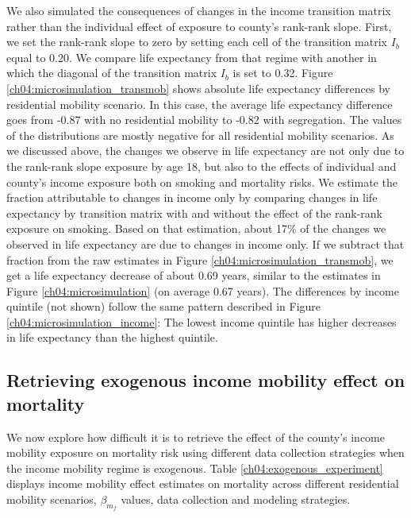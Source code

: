 \documentclass[class=article, crop=false, 12pt]{standalone}
\begin{document}
We also simulated the consequences of changes in the income transition matrix rather than the individual effect of exposure to county's rank-rank slope. First, we set the rank-rank slope to zero by setting each cell of the transition matrix $I_b$ equal to 0.20. We compare life expectancy from that regime with another in which the diagonal of the transition matrix $I_b$ is set to 0.32. Figure \ref{ch04:microsimulation_transmob} shows absolute life expectancy differences by residential mobility scenario. In this case, the average life expectancy difference goes from -0.87 with no residential mobility to -0.82 with segregation. The values of the distributions are mostly negative for all residential mobility scenarios. As we discussed above, the changes we observe in life expectancy are not only due to the rank-rank slope exposure by age 18, but also to the effects of individual and county's income exposure both on smoking and mortality risks. We estimate the fraction attributable to changes in income only by comparing changes in life expectancy by transition matrix with and without the effect of the rank-rank exposure on smoking. Based on that estimation, about 17\% of the changes we observed in life expectancy are due to changes in income only. If we subtract that fraction from the raw estimates in Figure \ref{ch04:microsimulation_transmob}, we get a life expectancy decrease of about 0.69 years, similar to the estimates in Figure \ref{ch04:microsimulation} (on average 0.67 years). The differences by income quintile (not shown) follow the same pattern described in Figure \ref{ch04:microsimulation_income}: The lowest income quintile has higher decreases in life expectancy than the highest quintile.

\subsection{Retrieving exogenous income mobility effect on mortality}

We now explore how difficult it is to retrieve the effect of the county's  income mobility exposure on mortality risk using different data collection strategies when the income mobility regime is exogenous. Table \ref{ch04:exogenous_experiment} displays income mobility effect estimates on mortality across different residential mobility scenarios, $\beta_{m_{f}}$ values, data collection and modeling strategies.
\end{document}
